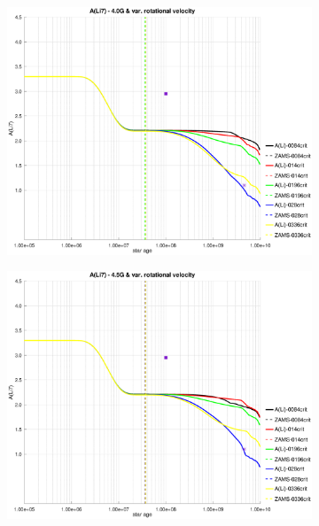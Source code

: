 \documentclass[fleqn,usenatbib]{mnras}
\begin{document}
\begin{figure}
    \begin{subfigure}[h]{0.47\textwidth}
    \includegraphics[trim = 35mm 15mm 20mm 15mm, clip,width=\textwidth]{figures/li_var_vel_4_0g.eps}
    \label{fig:subim3}
    \end{subfigure}
    \begin{subfigure}[h]{0.47\textwidth}
    \includegraphics[trim = 35mm 15mm 20mm 15mm, clip,width=\textwidth]{figures/li_var_vel_4_5g.eps}
    \label{fig:subim4}
    \end{subfigure}
    

\end{figure}
\end{document}
